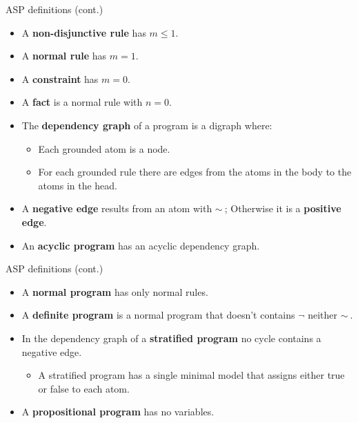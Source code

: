 \documentclass[bigger]{beamer}
\newcommand{\naf}{\ensuremath{\sim\!\!}}
\begin{document}
    \begin{frame}{ASP definitions \hfill(cont.)}
        \begin{itemize}\setcounter{enumi}{7}
            \item A \textbf{non-disjunctive rule} has $m \leq 1$.
            \item A \textbf{normal rule} has $m = 1$.
            \item A \textbf{constraint} has $m = 0$.
            \item A \textbf{fact} is a normal rule with $n = 0$.
            \item The \textbf{dependency graph} of a program is a digraph where:
            \begin{itemize}
                \item Each grounded atom is a node.
                \item For each grounded rule there are edges from the atoms in the body to the atoms in the head.
            \end{itemize} 
            \item A \textbf{negative edge} results from an atom with $\naf~$; Otherwise it is a \textbf{positive edge}.
            \item An \textbf{acyclic program} has an acyclic dependency graph.
        \end{itemize}
    \end{frame}

    \begin{frame}{ASP definitions \hfill(cont.)}
        \begin{itemize}\setcounter{enumi}{14}
            \item A \textbf{normal program} has only normal rules.
            \item A \textbf{definite program} is a normal program that doesn't contains $\neg$ neither $\naf~$.
            \item In the dependency graph of a \textbf{stratified program} no cycle contains a negative edge.
            \begin{itemize}
                \item A stratified program has a single minimal model that assigns either true or false to each atom.
            \end{itemize}
            \item A \textbf{propositional program} has no variables.
        \end{itemize}
    \end{frame}
\end{document}
